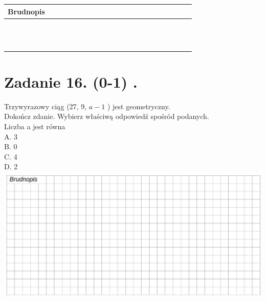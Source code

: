 \documentclass[10pt]{article}
\begin{document}
\begin{center}
\begin{tabular}{|c|c|c|c|c|c|c|c|c|c|c|c|c|c|c|c|c|c|c|c|c|c|c|c|}
\hline
\multicolumn{4}{|l|}{Brudnopis} &  &  &  &  &  &  &  &  &  &  &  &  &  &  &  &  &  &  &  &  \\
\hline
 &  &  &  &  &  &  &  &  &  &  &  &  &  &  &  &  &  &  &  &  &  &  &  \\
\hline
 &  &  &  &  &  &  &  &  &  &  &  &  &  &  &  &  &  &  &  &  &  &  &  \\
\hline
 &  &  &  &  &  &  &  &  &  &  &  &  &  &  &  &  &  &  &  &  &  &  &  \\
\hline
 &  &  &  &  &  &  &  &  &  &  &  &  &  &  &  &  &  &  &  &  &  &  &  \\
\hline
 &  &  &  &  &  &  &  &  &  &  &  &  &  &  &  &  &  &  &  &  &  &  &  \\
\hline
 &  &  &  &  &  &  &  &  &  &  &  &  &  &  &  &  &  &  &  &  &  &  &  \\
\hline
 &  &  &  &  &  &  &  &  &  &  &  &  &  &  &  &  &  &  &  &  &  &  &  \\
\hline
 &  &  &  &  &  &  &  &  &  &  &  &  &  &  &  &  &  &  &  &  &  &  &  \\
\hline
 &  &  &  &  &  &  &  &  &  &  &  &  &  &  &  &  &  &  &  &  &  &  &  \\
\hline
 &  &  &  &  &  &  &  &  &  &  &  &  &  &  &  &  &  &  &  &  &  &  &  \\
\hline
 &  &  &  &  &  &  &  &  &  &  &  &  &  &  &  &  &  &  &  &  &  &  &  \\
\hline
 &  &  &  &  &  &  &  &  &  &  &  &  &  &  &  &  &  &  &  &  &  &  &  \\
\hline
\end{tabular}
\end{center}

\section*{Zadanie 16. (0-1) .}
Trzywyrazowy ciąg (27, 9, \(a-1\) ) jest geometryczny.\\
Dokończ zdanie. Wybierz właściwą odpowiedź spośród podanych.\\
Liczba a jest równa\\
A. 3\\
B. 0\\
C. 4\\
D. 2\\
\includegraphics[max width=\textwidth, center]{2024_11_21_51cb67544fb9b029f01cg-15}
\end{document}
